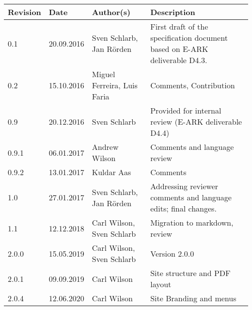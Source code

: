\begin{tabular}{|p{}|p{}|p{4cm}|p{7cm}|}
\hline
\textbf{Revision} & \textbf{Date} & \textbf{Author(s)} & \textbf{Description}                                                  \\
\hline
0.1   & 20.09.2016 & Sven Schlarb, Jan Rörden     & First draft of the specification document based on E-ARK deliverable D4.3. \\
\hline
0.2   & 15.10.2016 & Miguel Ferreira, Luis Faria  & Comments, Contribution                                                     \\
\hline
0.9   & 20.12.2016 & Sven Schlarb                 & Provided for internal review (E-ARK deliverable D4.4)                      \\
\hline
0.9.1 & 06.01.2017 & Andrew Wilson                & Comments and language review                                               \\
\hline
0.9.2 & 13.01.2017 & Kuldar Aas                   & Comments                                                                   \\
\hline
1.0   & 27.01.2017 & Sven Schlarb, Jan Rörden     & Addressing reviewer comments and language edits; final changes.            \\
\hline
1.1   & 12.12.2018 & Carl Wilson, Sven Schlarb    & Migration to markdown, review                                              \\
\hline
2.0.0 & 15.05.2019 & Carl Wilson, Sven Schlarb    & Version 2.0.0                                                              \\
\hline
2.0.1 & 09.09.2019 & Carl Wilson                  & Site structure and PDF layout                                              \\
\hline
2.0.4 & 12.06.2020 & Carl Wilson                  & Site Branding and menus                                                    \\
\end{tabular}

\pagebreak
